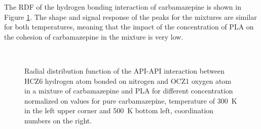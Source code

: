 The RDF of the hydrogen bonding interaction of carbamazepine is shown in Figure \ref{fig:cbz_RDF_}. The shape and signal response of the peaks for the mixtures are similar for both temperatures, meaning that the impact of the concentration of PLA on the cohesion of carbamazepine in the mixture is very low. 

\begin{figure}[htb!]
	\centering
	\\
	\caption{Radial distribution function of the API-API interaction between HCZ6 hydrogen atom bonded on nitrogen and OCZ1 oxygen atom in a mixture of carbamazepine and PLA for different concentration normalized on values for pure carbamazepine, temperature of 300~K in the left upper corner and 500~K bottom left, coordination numbers on the right.}
	\label{fig:cbz_RDF_}
\end{figure}



